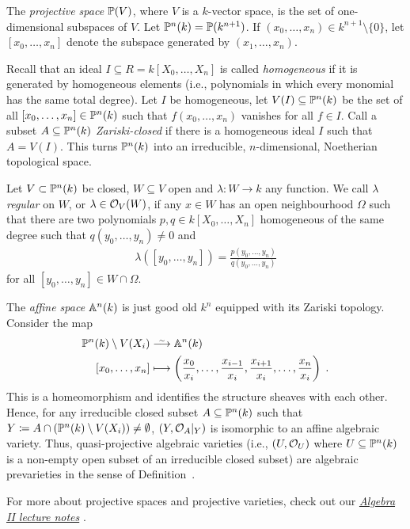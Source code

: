 \documentclass[a4paper,parskip=half,numbers=enddot, DIV=12]{scrreprt}
\begin{document}
	\begin{example}
	    The \emph{projective space} $\mathbb{P}(V)$, where $V$ is a $k$-vector space, is the set of one-dimensional subspaces of $V$. Let $\mathbb{P}^n(k) = \mathbb{P}(k^{n+1})$. If $(x_0,\ldots,x_n)\in k^{n+1}\setminus\{0\}$, let $[x_0,\ldots,x_n]$ denote the subspace generated by $(x_1,\ldots, x_n)$.
	     
	     Recall that an ideal $I\subseteq R=k[X_0,\ldots,X_n]$ is called \emph{homogeneous} if it is generated by homogeneous elements (i.e., polynomials in which every monomial has the same total degree). Let $I$ be homogeneous, let $V(I)\subseteq \mathbb{P}^n(k)$ be the set of all $[x_0, \ldots, x_n]\in\mathbb{P}^n(k)$ such that $f(x_0,\ldots, x_n)$ vanishes for all $f\in I$. Call a subset $A\subseteq\mathbb{P}^n(k)$ \emph{Zariski-closed} if there is a homogeneous ideal $I$ such that $A= V(I)$. This turns $\mathbb{P}^n(k)$ into an irreducible, $n$-dimensional, Noetherian topological space.
	     
	     Let $V\subset \mathbb{P}^n(k)$ be closed, $W\subseteq V$ open and $\lambda\colon W\to k$ any function. We call $\lambda$ \emph{regular} on $W$, or $\lambda \in \mathcal{O}_V(W)$, if any $x\in W$ has an open neighbourhood $\Omega$ such that there are two polynomials $p,q\in k[X_0,\ldots,X_n]$ homogeneous of the same degree such that $q(y_0,\ldots,y_n) \neq 0$ and 
	     \begin{align*}
	     	\lambda([y_0,\ldots,y_n]) = \frac{p(y_0,\ldots,y_n)}{q(y_0,\ldots,y_n)}
	     \end{align*}
	     for all $[y_0,\ldots,y_n]\in W\cap \Omega$.
	     
	     The \emph{affine space} $\mathbb{A}^n(k)$ is just good old $k^n$ equipped with its Zariski topology. Consider the map
	     \begin{align*}
	        \IP^n(k)\setminus V(X_i) &\isomorphism \IA^n(k)\\
	        [x_0,\ldots, x_n]&\longmapsto \left(\frac{x_0}{x_i}, \ldots, 
	        \frac{x_{i-1}}{x_i},\frac{x_{i+1}}{x_i},\ldots,\frac{x_n}{x_i}\right)\;.
	    \end{align*}
	    This is a homeomorphism and identifies the structure sheaves with each other. Hence, for any irreducible closed subset $A\subseteq \mathbb{P}^n(k)$ such that $Y\coloneqq A\cap(\mathbb{P}^n(k)\setminus V(X_i)) \neq \emptyset$, $(Y, \mathcal{O}_A|_Y) $ is isomorphic to an affine algebraic variety. Thus, quasi-projective algebraic varieties (i.e., $(U,\mathcal{O}_U)$ where $U\subseteq \mathbb{P}^n(k)$ is a non-empty open subset of an irreducible closed subset) are algebraic prevarieties in the sense of Definition~.
	    
	    For more about projective spaces and projective varieties, check out our \href{https://github.com/Nicholas42/AlgebraFranke/tree/master/AlgebraII}{\emph{Algebra II lecture notes}} \cite[Chapter 2]{alg2}.
\end{example}
\end{document}
